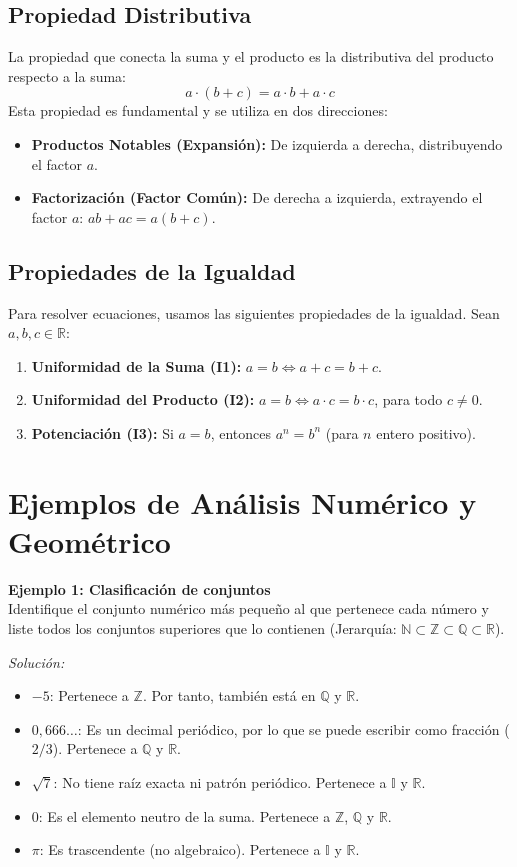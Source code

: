 \subsection*{Propiedad Distributiva}
La propiedad que conecta la suma y el producto es la distributiva del producto respecto a la suma:
\[ a\cdot(b+c) = a\cdot b + a\cdot c \]
Esta propiedad es fundamental y se utiliza en dos direcciones:
\begin{itemize}
    \item \textbf{Productos Notables (Expansión):} De izquierda a derecha, distribuyendo el factor $a$.
    \item \textbf{Factorización (Factor Común):} De derecha a izquierda, extrayendo el factor $a$: $ab+ac = a(b+c)$.
\end{itemize}

\subsection*{Propiedades de la Igualdad}
Para resolver ecuaciones, usamos las siguientes propiedades de la igualdad. Sean $a,b,c \in \mathbb{R}$:
\begin{enumerate}
    \item \textbf{Uniformidad de la Suma (I1):} $a=b \iff a+c = b+c$.
    \item \textbf{Uniformidad del Producto (I2):} $a=b \iff a\cdot c = b\cdot c$, para todo $c \neq 0$.
    \item \textbf{Potenciación (I3):} Si $a=b$, entonces $a^n = b^n$ (para $n$ entero positivo).
\end{enumerate}
\section{Ejemplos de Análisis Numérico y Geométrico}

\textbf{Ejemplo 1: Clasificación de conjuntos} \\
Identifique el conjunto numérico más pequeño al que pertenece cada número y liste todos los conjuntos superiores que lo contienen (Jerarquía: $\mathbb{N} \subset \mathbb{Z} \subset \mathbb{Q} \subset \mathbb{R}$).

\textit{Solución:}
\begin{itemize}
    \item $-5$: Pertenece a $\mathbb{Z}$. Por tanto, también está en $\mathbb{Q}$ y $\mathbb{R}$.
    \item $0,666\dots$: Es un decimal periódico, por lo que se puede escribir como fracción ($2/3$). Pertenece a $\mathbb{Q}$ y $\mathbb{R}$.
    \item $\sqrt{7}$: No tiene raíz exacta ni patrón periódico. Pertenece a $\mathbb{I}$ y $\mathbb{R}$.
    \item $0$: Es el elemento neutro de la suma. Pertenece a $\mathbb{Z}$, $\mathbb{Q}$ y $\mathbb{R}$.
    \item $\pi$: Es trascendente (no algebraico). Pertenece a $\mathbb{I}$ y $\mathbb{R}$.
\end{itemize}

